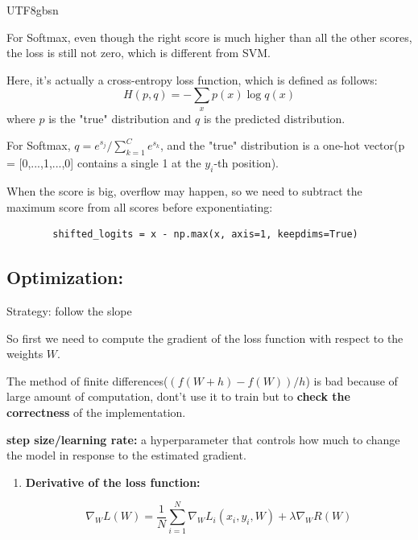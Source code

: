 \documentclass{article}
\numberwithin{equation}{section}
\begin{document}
\begin{CJK}{UTF8}{gbsn}
\begin{enumerate}
    For Softmax, even though the right score is much higher than all the other scores, the loss is still not zero, which is different from SVM.\par
    
    Here, it's actually a cross-entropy loss function, which is defined as follows:
    \begin{equation*}\tag {Cross-entropy}
        H(p, q) = -\sum_{x} p(x) \log q(x)
    \end{equation*}
    where \(p\) is the "true" distribution and \(q\) is the predicted distribution.\par
    For Softmax, \(q = e^{s_j} / \sum_{k=1}^{C} e^{s_k}\), and the "true" distribution is a one-hot vector(p = [0,...,1,...,0] contains a single 1 at the \(y_i\)-th position).\par

    When the score is big, overflow may happen, so we need to subtract the maximum score from all scores before exponentiating:
    \begin{verbatim}
        shifted_logits = x - np.max(x, axis=1, keepdims=True)
    \end{verbatim}
     
\end{enumerate}

\subsection{Optimization:}
    Strategy: follow the slope

    So first we need to compute the gradient of the loss function with respect to the weights \(W\).\par
    The method of finite differences(\((f(W+h) - f(W)) / h\)) is bad because of large amount of computation, dont't use it to train but to \textbf{check the correctness} of the implementation.\par

    \vspace{0.5cm}
    \textbf{step size/learning rate:} a hyperparameter that controls how much to change the model in response to the estimated gradient.\par

    \begin{enumerate}
        \item \textbf{Derivative of the loss function:}\par
        \begin{equation}
        \nabla_W L(W) = \frac{1}{N} \sum_{i=1}^{N} \nabla_W L_i(x_i, y_i, W) + \lambda \nabla_W R(W)
        \end{equation}


\end{enumerate}
\end{CJK}
\end{document}
